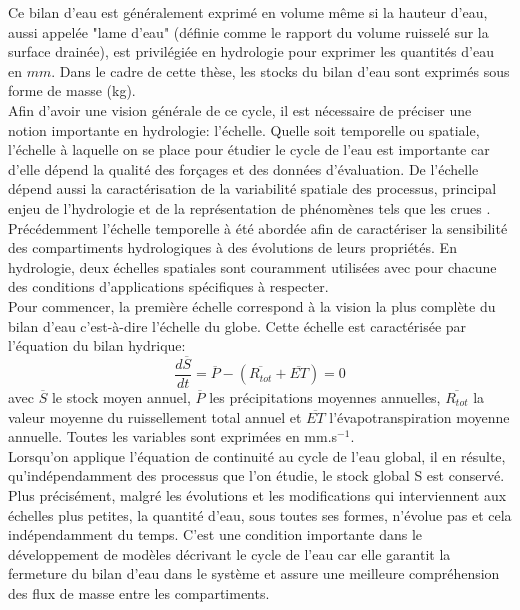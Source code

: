 \noindent Ce bilan d'eau est généralement exprimé en volume même si la hauteur d'eau, aussi appelée "lame d'eau" (définie comme le rapport du volume ruisselé sur la surface drainée), est privilégiée en hydrologie pour exprimer les quantités d'eau  en $mm$. Dans le cadre de cette thèse, les stocks du bilan d'eau sont exprimés sous forme de masse (kg).\\

Afin d'avoir une vision générale de ce cycle, il est nécessaire de préciser une notion importante en hydrologie: l'échelle. Quelle soit temporelle ou spatiale, l'échelle à laquelle on se place pour étudier le cycle de l'eau est importante car d'elle dépend la qualité des forçages et des données d'évaluation. De l'échelle dépend aussi la caractérisation de la variabilité spatiale des processus, principal enjeu de l'hydrologie et de la représentation de phénomènes tels que les crues \citep{bloschl1995,beven2001}. Précédemment l'échelle temporelle à été abordée afin de caractériser la sensibilité des compartiments hydrologiques à des évolutions de leurs propriétés. En hydrologie, deux échelles spatiales sont couramment utilisées avec pour chacune des conditions d'applications spécifiques à respecter. \\
Pour commencer, la première échelle correspond à la vision la plus complète du bilan d'eau c'est-à-dire l'échelle du globe. Cette échelle est caractérisée par l'équation du bilan hydrique: 
\begin{equation}
\frac{d\overline{S}}{dt} = \overline{P} - (\overline{R_{tot}} + \overline{ET}) = 0
\end{equation}
avec $\overline{S}$ le stock moyen annuel, $\overline{P}$ les précipitations moyennes annuelles, $\overline{R_{tot}}$ la valeur moyenne du ruissellement total annuel et $\overline{ET}$ l'évapotranspiration moyenne annuelle. Toutes les variables sont exprimées en mm.s$^{-1}$.
\\

Lorsqu'on applique l'équation de continuité au cycle de l'eau global, il en résulte, qu'indépendamment des processus que l'on étudie, le stock global S est conservé. Plus précisément, malgré les évolutions et les modifications qui interviennent aux échelles plus petites, la quantité d'eau, sous toutes ses formes, n'évolue pas et cela indépendamment du temps. C'est une condition importante dans le développement de modèles décrivant le cycle de l'eau car elle garantit la fermeture du bilan d'eau dans le système et assure une meilleure compréhension des flux de masse entre les compartiments.
\\

